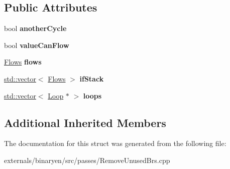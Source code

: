 \subsection*{Public Attributes}
\begin{DoxyCompactItemize}
\item 
\mbox{\label{structwasm_1_1_remove_unused_brs_a0744762088df011c731181ea18a5c345}} 
bool {\bfseries another\+Cycle}
\item 
\mbox{\label{structwasm_1_1_remove_unused_brs_a897d170368b655a5dbb84692e6781c74}} 
bool {\bfseries value\+Can\+Flow}
\item 
\mbox{\label{structwasm_1_1_remove_unused_brs_a1132147724763f4bdae21defc90f334f}} 
\mbox{\hyperlink{classstd_1_1vector}{Flows}} {\bfseries flows}
\item 
\mbox{\label{structwasm_1_1_remove_unused_brs_a48def56d356adebc645aeea14a3ed9fc}} 
\mbox{\hyperlink{classstd_1_1vector}{std\+::vector}}$<$ \mbox{\hyperlink{classstd_1_1vector}{Flows}} $>$ {\bfseries if\+Stack}
\item 
\mbox{\label{structwasm_1_1_remove_unused_brs_ae2504de896bee9e965fdf60c00f36342}} 
\mbox{\hyperlink{classstd_1_1vector}{std\+::vector}}$<$ \mbox{\hyperlink{classwasm_1_1_loop}{Loop}} $\ast$ $>$ {\bfseries loops}
\end{DoxyCompactItemize}
\subsection*{Additional Inherited Members}


The documentation for this struct was generated from the following file\+:\begin{DoxyCompactItemize}
\item 
externals/binaryen/src/passes/Remove\+Unused\+Brs.\+cpp\end{DoxyCompactItemize}
